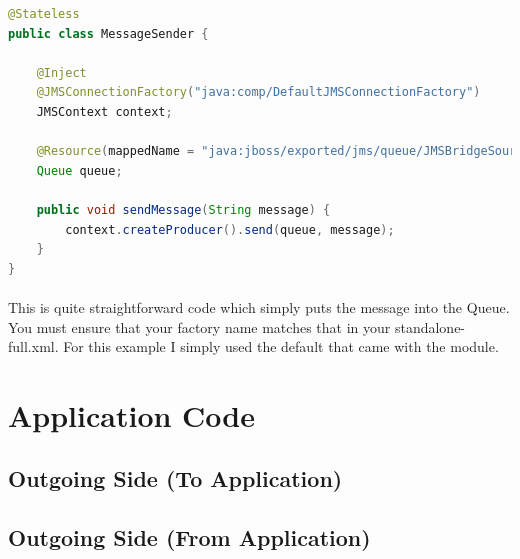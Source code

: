 \documentclass[
10pt, %
letterpaper, %
oneside, %
headinclude,footinclude, %
BCOR5mm, %
]{scrartcl}
\begin{document}
\begin{lstlisting}[language=Java]
@Stateless
public class MessageSender {

    @Inject
    @JMSConnectionFactory("java:comp/DefaultJMSConnectionFactory")
    JMSContext context;

    @Resource(mappedName = "java:jboss/exported/jms/queue/JMSBridgeSourceQ")
    Queue queue;

    public void sendMessage(String message) {
        context.createProducer().send(queue, message);
    }
}
\end{lstlisting}

\paragraph{}
This is quite straightforward code which simply puts the message into the Queue. You must ensure that your factory name matches that in your standalone-full.xml. For this example I simply used the default that came with the module.



\section{Application Code}


\subsection{\textbf{Outgoing Side (To Application)}}
\subsection{\textbf{Outgoing Side (From Application)}}
\end{document}
